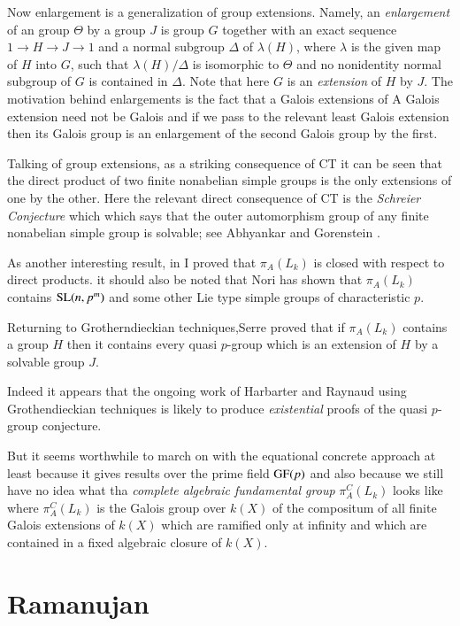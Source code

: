 Now enlargement is a generalization of group extensions. Namely, an \textit{enlargement} of an group $\Theta$ by a group $J$ is group $G$ together with an exact sequence $1 \rightarrow H \rightarrow J \rightarrow 1 $ and a normal subgroup $\Delta$ of $\lambda(H)$, where $\lambda$ is the given map of $H$ into $G$, such that $\lambda(H)/\Delta$ is isomorphic to  $\Theta$ and no nonidentity normal subgroup of $G$ is contained in $\Delta$. Note that here $G$ is an \textit{extension} of $H$ by $J$. The motivation behind enlargements is the fact that a Galois extensions of A Galois extension need not be Galois and if we pass to the relevant least Galois extension then its Galois group is an enlargement of the second Galois group by the first.

Talking of group extensions, as a striking consequence of CT it can be seen that the direct product of two finite nonabelian simple groups is the only extensions of one by the other. Here the relevant direct consequence of CT is the \textit{Schreier Conjecture} which which says that the outer automorphism group of any finite nonabelian simple group is solvable; see Abhyankar \cite{chap1-key11} and Gorenstein \cite{chap1-key32}.

As another interesting result, in \cite{chap1-key12} I proved that $\pi_{A}(L_{k})$ is closed with respect to direct products. it should also be noted that Nori \cite{chap1-key49} has shown that $\pi_{A}(L_{k})$ contains $\operatorname{SL}(n,p^m)$ and some other Lie type simple groups of characteristic $p$.

Returning to Grotherndieckian techniques,Serre \cite{chap1-key56} proved that if $\pi_{A}(L_{k})$ contains a group $H$ then it contains every quasi $p$-group which is an extension of $H$ by a solvable group $J$. 

Indeed it appears that the ongoing work of Harbarter and Raynaud using Grothendieckian techniques is likely to produce \textit{existential} proofs of the quasi $p$-group conjecture.

But it seems worthwhile to march on with the equational concrete approach at least because it gives results over the prime field $\operatorname{GF}(p)$ and also because we still have no idea what tha \textit{complete algebraic fundamental group} $\pi^{C}_{A}(L_{k})$ looks like where $\pi^{C}_{A}(L_{k})$ is the Galois group over $k(X)$ of the compositum of all finite Galois extensions of $k(X)$ which are ramified only at infinity and which are contained in a fixed algebraic closure of $k(X)$. 

\section{Ramanujan}

